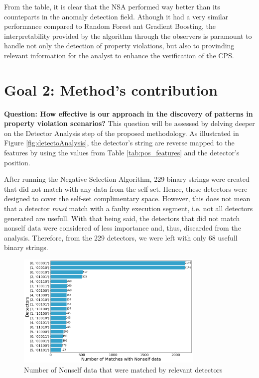 From the table, it is clear that the NSA performed way better than its counteparts in the anomaly detection field. Athough it had a very similar performance compared to Random Forest ant Gradient Boosting, the interpretability provided by the algorithm through the observers is paramount to handle not only the detection of property violations, but also to provinding relevant information for the analyst to enhance the verification of the CPS.

\section{Goal 2: Method's contribution}
\textbf{Question: How effective is our approach in the discovery of patterns in property violation scenarios?} This question will be assessed by delving deeper on the Detector Analysis step of the proposed methodology. As illustrated in Figure \ref{fig:detectoAnalysis}, the detector's string are reverse mapped to the features by using the values from Table \ref{tab:pos_features} and the detector's position. 

After running the Negative Selection Algorithm, 229 binary strings were created that did not match with any data from the self-set. Hence, these detectors were designed to cover the self-set complimentary space. However, this does not mean that a detector \textit{must} match with a faulty execution segment, i.e. not all detectors generated are usefull. With that being said, the detectors that did not match nonself data were considered of less importance and, thus, discarded from the analysis. Therefore, from the 229 detectors, we were left with only 68 usefull binary strings. 

\begin{figure}[]
	\centering
	\includegraphics[width=0.8\textwidth, keepaspectratio]{img/matches_by_detector_rdz.png}
	\caption{Number of Nonself data that were matched by relevant detectors}
	\label{fig:ev_det_match}
\end{figure}

